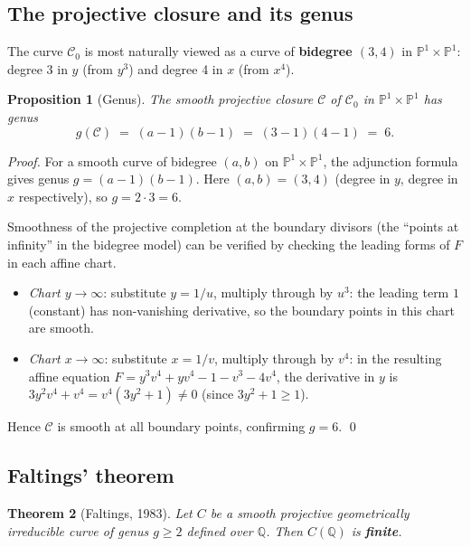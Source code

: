 \documentclass[12pt, a4paper]{article}
\newtheorem{theorem}{Theorem}[section]
\newtheorem{proposition}[theorem]{Proposition}
\theoremstyle{definition}
\newcommand{\Q}{\mathbb{Q}}
\newcommand{\Proj}{\mathbb{P}}
\begin{document}
\subsection{The projective closure and its genus}

The curve $\mathcal{C}_0$ is most naturally viewed as a curve of \textbf{bidegree
$(3,4)$} in $\Proj^1 \times \Proj^1$: degree 3 in $y$ (from $y^3$) and degree 4
in $x$ (from $x^4$).

\begin{proposition}[Genus]\label{prop:genus}
  The smooth projective closure $\mathcal{C}$ of $\mathcal{C}_0$ in
  $\Proj^1 \times \Proj^1$ has genus
  \[
    g(\mathcal{C}) \;=\; (a-1)(b-1) \;=\; (3-1)(4-1) \;=\; 6.
  \]
\end{proposition}

\begin{proof}
  For a smooth curve of bidegree $(a, b)$ on $\Proj^1 \times \Proj^1$, the
  adjunction formula gives genus $g = (a-1)(b-1)$.  Here $(a,b) = (3,4)$
  (degree in $y$, degree in $x$ respectively), so $g = 2 \cdot 3 = 6$.

  Smoothness of the projective completion at the boundary divisors
  (the ``points at infinity'' in the bidegree model) can be verified by
  checking the leading forms of $F$ in each affine chart.
  \begin{itemize}[noitemsep]
    \item \emph{Chart $y \to \infty$}: substitute $y = 1/u$, multiply through
      by $u^3$: the leading term $1$ (constant) has non-vanishing derivative,
      so the boundary points in this chart are smooth.
    \item \emph{Chart $x \to \infty$}: substitute $x = 1/v$, multiply through
      by $v^4$: in the resulting affine equation $F = y^3v^4 + yv^4 - 1 - v^3 - 4v^4$,
      the derivative in $y$ is $3y^2v^4 + v^4 = v^4(3y^2+1) \neq 0$
      (since $3y^2+1 \geq 1$).
  \end{itemize}
  Hence $\mathcal{C}$ is smooth at all boundary points, confirming $g = 6$. \qed
\end{proof}

\subsection{Faltings' theorem}

\begin{theorem}[Faltings, 1983]\label{thm:faltings}
  Let $C$ be a smooth projective geometrically irreducible curve of genus
  $g \geq 2$ defined over $\Q$.  Then $C(\Q)$ is \textbf{finite}.
\end{theorem}
\end{document}
